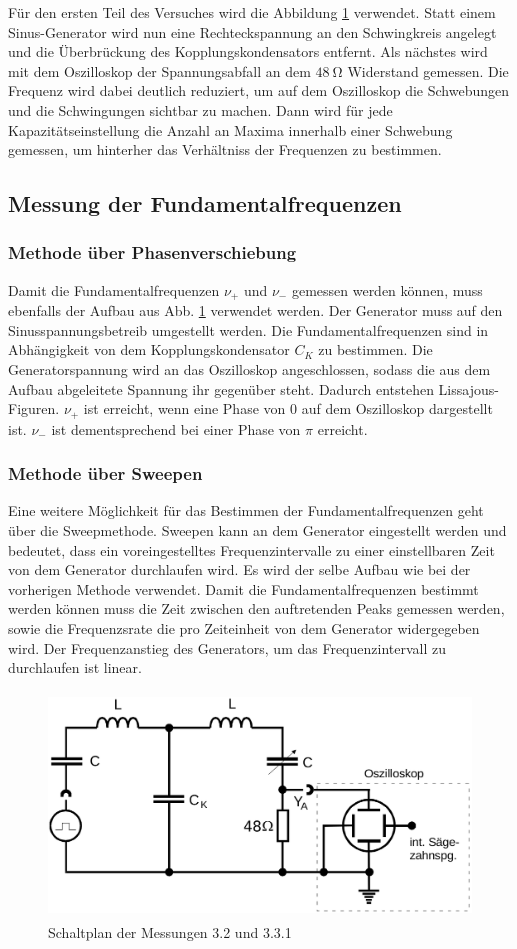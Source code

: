 Für den ersten Teil des Versuches wird die Abbildung \ref{Schaltplan} verwendet. Statt einem
Sinus-Generator wird nun eine Rechteckspannung an den Schwingkreis angelegt und
die Überbrückung des Kopplungskondensators entfernt. Als nächstes wird mit dem
Oszilloskop der Spannungsabfall an dem $\SI{48}{\ohm}$ Widerstand gemessen.
Die Frequenz wird dabei deutlich reduziert, um auf dem Oszilloskop
die Schwebungen und die Schwingungen sichtbar zu machen.
Dann wird für jede Kapazitätseinstellung die Anzahl an Maxima innerhalb einer
Schwebung gemessen, um hinterher das Verhältniss der Frequenzen zu bestimmen.

\subsection{Messung der Fundamentalfrequenzen}

\subsubsection{Methode über Phasenverschiebung}

Damit die Fundamentalfrequenzen $\nu_+$ und $\nu_-$ gemessen werden können, muss
ebenfalls der Aufbau aus Abb. \ref{Schaltplan} verwendet werden. Der Generator muss auf den
Sinusspannungsbetreib umgestellt werden. Die Fundamentalfrequenzen sind in Abhängigkeit
von dem Kopplungskondensator $C_K$ zu bestimmen. Die Generatorspannung wird an das
Oszilloskop angeschlossen, sodass die aus dem Aufbau abgeleitete Spannung ihr
gegenüber steht. Dadurch entstehen Lissajous-Figuren. $\nu_+$ ist erreicht, wenn
eine Phase von $0$ auf dem Oszilloskop dargestellt ist. $\nu_-$ ist dementsprechend
bei einer Phase von $\pi$ erreicht.

\subsubsection{Methode über Sweepen}

Eine weitere Möglichkeit für das Bestimmen der Fundamentalfrequenzen geht über die
Sweepmethode.
Sweepen kann an dem Generator eingestellt werden und bedeutet, dass ein voreingestelltes
Frequenzintervalle zu einer einstellbaren Zeit von dem Generator durchlaufen wird.
Es wird der selbe Aufbau wie bei der vorherigen Methode verwendet.
Damit die Fundamentalfrequenzen bestimmt werden können muss die Zeit zwischen den
auftretenden Peaks gemessen werden, sowie die Frequenzsrate die pro Zeiteinheit
von dem Generator widergegeben wird. Der Frequenzanstieg des Generators, um das
Frequenzintervall zu durchlaufen ist linear.

\begin{figure}
  \includegraphics[width = \textwidth, height = 6cm]{aufbau_schwebung.png}
  \caption{Schaltplan der Messungen 3.2 und 3.3.1}
  \label{Schaltplan}
\end{figure}
